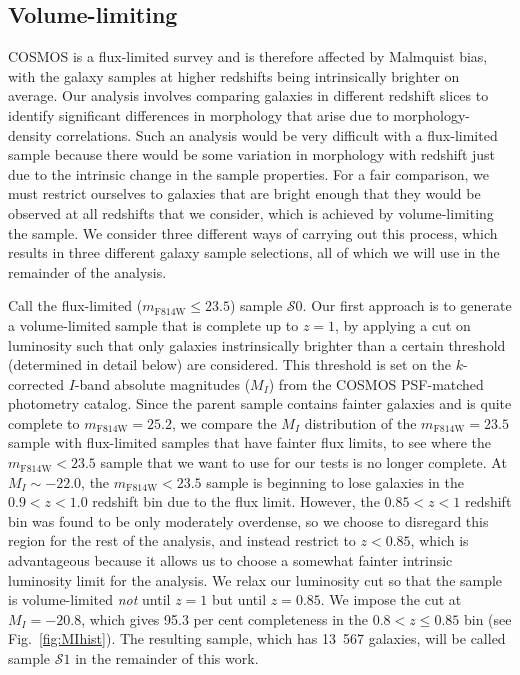 \documentclass[twocolumn,useAMS,usenatbib]{mn2e}
\newcommand{\s}{\ensuremath{\mathcal{S}}}
\begin{document}
\subsection{Volume-limiting}
\label{sub:volumelimiting}
 
COSMOS is a flux-limited survey and is therefore affected by Malmquist
bias, with the galaxy samples at higher redshifts being intrinsically
brighter on average.  
Our analysis involves comparing galaxies in different redshift slices
to identify significant differences in morphology that arise due to
morphology-density correlations.  Such an analysis would be very
difficult with a flux-limited sample because there would be some
variation in morphology with redshift just due to the intrinsic change
in the sample properties.  For a fair comparison, we must restrict
ourselves to galaxies that are bright enough that they would be
observed at all redshifts that we consider, which is achieved by
volume-limiting the sample.  We consider three different ways of
carrying out this process, which results in three different galaxy
sample selections, all of which we will use in the remainder of the												
analysis.

Call the flux-limited ($m_\text{F814W} \le 23.5$) sample \s$0$. Our first approach is to generate a volume-limited sample that is
complete up to $z=1$, by applying a cut on luminosity such that only
galaxies instrinsically brighter than a certain threshold (determined
in detail below) are considered. This threshold is set on the
$k$-corrected $I$-band absolute magnitudes ($M_I$) from the COSMOS PSF-matched
photometry catalog.   
Since the parent sample contains fainter galaxies and is quite
complete to $m_\text{F814W}=25.2$,
we compare the $M_I$ distribution
of the $m_\text{F814W}=23.5$ sample with flux-limited samples that
have fainter flux limits, to see where the $m_\text{F814W}<23.5$
sample that we want to use for our tests is no longer complete.
At $M_I\sim-22.0$, the
$m_\text{F814W}<23.5$ sample is beginning to lose galaxies in the
$0.9<z<1.0$ redshift bin due to the flux limit. However, the $0.85<z<1$
redshift bin was found to be only moderately overdense, so we choose
to disregard this region for the rest of the analysis, and instead
restrict to $z<0.85$, which is advantageous because it allows us to
choose a somewhat fainter intrinsic luminosity limit for the
analysis.  We relax our luminosity cut
so that the sample is volume-limited \emph{not} until $z=1$ but until $z=0.85$. 
We impose the cut at $M_I=-20.8$, which gives 95.3 per cent completeness in
the $0.8 < z \le 0.85$ bin (see Fig.~\ref{fig:MIhist}). The resulting
sample, which has 13~567 galaxies, will be called sample \s$1$ in the remainder
of this work.
\end{document}
